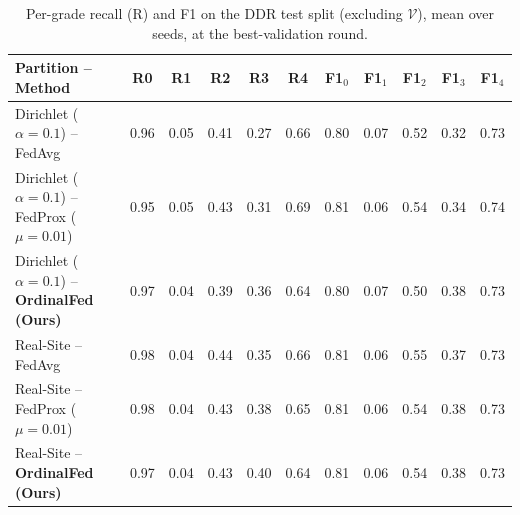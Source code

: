 \begin{table}[!t]
\centering
\caption{Per-grade recall (R) and F1 on the DDR test split (excluding $\mathcal{V}$), mean over seeds, at the best-validation round.}
\label{tab:pergrade}
\begin{tabular}{lcccccccccc}
\toprule
Partition -- Method & R0 & R1 & R2 & R3 & R4 & F1$_0$ & F1$_1$ & F1$_2$ & F1$_3$ & F1$_4$ \\
\midrule
Dirichlet ($\alpha=0.1$) -- FedAvg & 0.96 & 0.05 & 0.41 & 0.27 & 0.66 & 0.80 & 0.07 & 0.52 & 0.32 & 0.73 \\
Dirichlet ($\alpha=0.1$) -- FedProx ($\mu=0.01$) & 0.95 & 0.05 & 0.43 & 0.31 & 0.69 & 0.81 & 0.06 & 0.54 & 0.34 & 0.74 \\
Dirichlet ($\alpha=0.1$) -- \textbf{OrdinalFed (Ours)} & 0.97 & 0.04 & 0.39 & 0.36 & 0.64 & 0.80 & 0.07 & 0.50 & 0.38 & 0.73 \\
\midrule
Real-Site -- FedAvg & 0.98 & 0.04 & 0.44 & 0.35 & 0.66 & 0.81 & 0.06 & 0.55 & 0.37 & 0.73 \\
Real-Site -- FedProx ($\mu=0.01$) & 0.98 & 0.04 & 0.43 & 0.38 & 0.65 & 0.81 & 0.06 & 0.54 & 0.38 & 0.73 \\
Real-Site -- \textbf{OrdinalFed (Ours)} & 0.97 & 0.04 & 0.43 & 0.40 & 0.64 & 0.81 & 0.06 & 0.54 & 0.38 & 0.73 \\
\bottomrule
\end{tabular}
\end{table}
